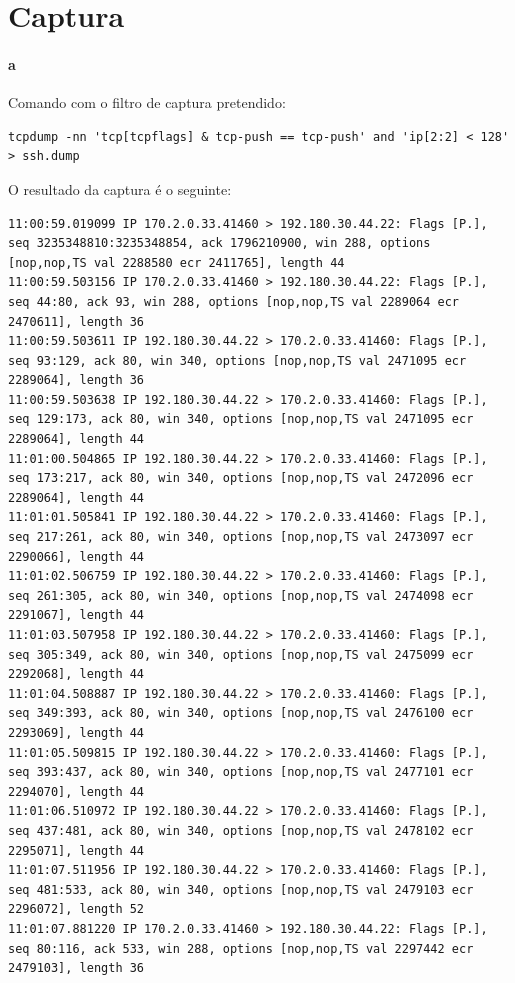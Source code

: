 \section{Captura}
\paragraph{a}
Comando com o filtro de captura pretendido:
\begin{verbatim}
tcpdump -nn 'tcp[tcpflags] & tcp-push == tcp-push' and 'ip[2:2] < 128' > ssh.dump
\end{verbatim}

O resultado da captura é o seguinte:
\begin{verbatim}
11:00:59.019099 IP 170.2.0.33.41460 > 192.180.30.44.22: Flags [P.], seq 3235348810:3235348854, ack 1796210900, win 288, options [nop,nop,TS val 2288580 ecr 2411765], length 44
11:00:59.503156 IP 170.2.0.33.41460 > 192.180.30.44.22: Flags [P.], seq 44:80, ack 93, win 288, options [nop,nop,TS val 2289064 ecr 2470611], length 36
11:00:59.503611 IP 192.180.30.44.22 > 170.2.0.33.41460: Flags [P.], seq 93:129, ack 80, win 340, options [nop,nop,TS val 2471095 ecr 2289064], length 36
11:00:59.503638 IP 192.180.30.44.22 > 170.2.0.33.41460: Flags [P.], seq 129:173, ack 80, win 340, options [nop,nop,TS val 2471095 ecr 2289064], length 44
11:01:00.504865 IP 192.180.30.44.22 > 170.2.0.33.41460: Flags [P.], seq 173:217, ack 80, win 340, options [nop,nop,TS val 2472096 ecr 2289064], length 44
11:01:01.505841 IP 192.180.30.44.22 > 170.2.0.33.41460: Flags [P.], seq 217:261, ack 80, win 340, options [nop,nop,TS val 2473097 ecr 2290066], length 44
11:01:02.506759 IP 192.180.30.44.22 > 170.2.0.33.41460: Flags [P.], seq 261:305, ack 80, win 340, options [nop,nop,TS val 2474098 ecr 2291067], length 44
11:01:03.507958 IP 192.180.30.44.22 > 170.2.0.33.41460: Flags [P.], seq 305:349, ack 80, win 340, options [nop,nop,TS val 2475099 ecr 2292068], length 44
11:01:04.508887 IP 192.180.30.44.22 > 170.2.0.33.41460: Flags [P.], seq 349:393, ack 80, win 340, options [nop,nop,TS val 2476100 ecr 2293069], length 44
11:01:05.509815 IP 192.180.30.44.22 > 170.2.0.33.41460: Flags [P.], seq 393:437, ack 80, win 340, options [nop,nop,TS val 2477101 ecr 2294070], length 44
11:01:06.510972 IP 192.180.30.44.22 > 170.2.0.33.41460: Flags [P.], seq 437:481, ack 80, win 340, options [nop,nop,TS val 2478102 ecr 2295071], length 44
11:01:07.511956 IP 192.180.30.44.22 > 170.2.0.33.41460: Flags [P.], seq 481:533, ack 80, win 340, options [nop,nop,TS val 2479103 ecr 2296072], length 52
11:01:07.881220 IP 170.2.0.33.41460 > 192.180.30.44.22: Flags [P.], seq 80:116, ack 533, win 288, options [nop,nop,TS val 2297442 ecr 2479103], length 36

\end{verbatim}
